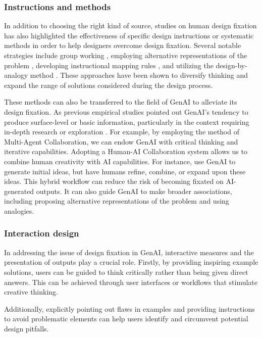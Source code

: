 \subsubsection{Instructions and methods}
In addition to choosing the right kind of source, studies on human design fixation has also highlighted the effectiveness of specific design instructions or systematic methods in order to help designers overcome design fixation. Several notable strategies include group working \cite{youmans2011effects}, employing alternative representations of the problem \cite{linsey2010study}, developing instructional mapping rules \cite{cheong2013using}, and utilizing the design-by-analogy method \cite{linsey2012design}. These approaches have been shown to diversify thinking and expand the range of solutions considered during the design process.

These methods can also be transferred to the field of GenAI to alleviate its design fixation. As previous empirical studies pointed out GenAI's tendency to produce surface-level or basic information, particularly in the context requiring in-depth research or exploration \cite{kobiella2024if}. For example, by employing the method of Multi-Agent Collaboration, we can endow GenAI with critical thinking and iterative capabilities. Adopting a Human-AI Collaboration system \cite{lee2024conversational} allows us to combine human creativity with AI capabilities. For instance, use GenAI to generate initial ideas, but have humans refine, combine, or expand upon these ideas. This hybrid workflow can reduce the risk of becoming fixated on AI-generated outputs. It can also guide GenAI to make broader associations, including proposing alternative representations of the problem and using analogies.

\subsubsection{Interaction design}
In addressing the issue of design fixation in GenAI, interactive measures and the presentation of outputs play a crucial role. Firstly, by providing inspiring example solutions, users can be guided to think critically rather than being given direct answers. This can be achieved through user interfaces or workflows that stimulate creative thinking. %

Additionally, explicitly pointing out flaws in examples and providing instructions to avoid problematic elements can help users identify and circumvent potential design pitfalls. %

